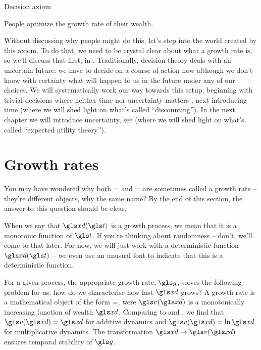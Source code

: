 \begin{keypts}{Decision axiom}

People optimize the growth rate of their wealth.

\end{keypts}

Without discussing why people might do this, let's step into the world created by this axiom. To do that, we need to be crystal clear about what a growth rate is, so we'll discuss that first, in . Traditionally, decision theory deals with an uncertain future: we have to decide on
a course of action now although we don't know with certainty what will happen to us in the future under any
of our choices. We will systematically work our way towards this setup, beginning with trivial decisions where neither time nor uncertainty matters , next introducing time  (where we will shed light on what's called ``discounting''). In the next chapter we will introduce uncertainty, see  (where we will shed light on what's called ``expected utility theory'').

%
\section{Growth rates}

You may have wondered why both 
\be
\gad=\frac{\xd(\t+\Dt)- \xd(\t)}{\Dt}
\ee
 and 
\be
\gexp= \frac{\ln \xd(\t+\Dt)-\ln \xd(\t)}{\Dt}
\ee
are sometimes called a growth rate -- they're different objects, why the same name? By the end of this section, the answer to this question should be clear.

When we say that $\xd(\t)$ is a growth process, we mean that it is a monotonic function of $\t$. If you're thinking about randomness -- don't, we'll come to that later. For now, we will just work with a deterministic function $\xd(\t)$ -- we even use an unusual font to indicate that this is a deterministic function.

For a given process, the appropriate growth rate, $\g$, solves the following problem for us: how do we characterise how fast $\xd$ grows?
A growth rate is a mathematical object of the form
\be
\g=\frac{\D\gv(\xd)}{\Dt},
\ee
were $\gv(\xd)$ is a monotonically increasing function of wealth $\xd$. Comparing to  and , we find that $\gv(\xd)=\xd$ for additive dynamics and $\gv(\xd)=\ln \xd$ for multiplicative dynamics. The transformation $\xd \to \gv(\xd)$ ensures temporal stability of $\g$.

